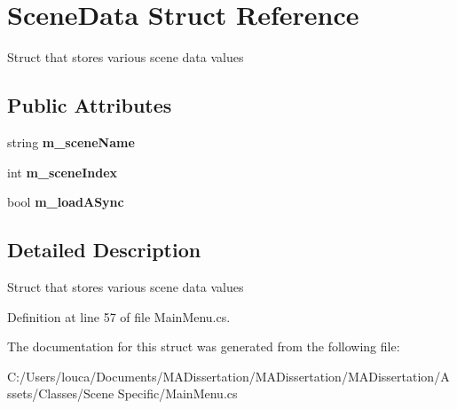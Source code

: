 \hypertarget{struct_scene_data}{}\section{Scene\+Data Struct Reference}
\label{struct_scene_data}


Struct that stores various scene data values  


\subsection*{Public Attributes}
\begin{DoxyCompactItemize}
\item 
\mbox{\label{struct_scene_data_a21525ac0e4967dd28c90f423bdf8082f}} 
string {\bfseries m\+\_\+scene\+Name}
\item 
\mbox{\label{struct_scene_data_a090335ef7fb48d46b1fec4a37b2f112d}} 
int {\bfseries m\+\_\+scene\+Index}
\item 
\mbox{\label{struct_scene_data_a06a2ef794bb7dccc71f5748983685969}} 
bool {\bfseries m\+\_\+load\+A\+Sync}
\end{DoxyCompactItemize}


\subsection{Detailed Description}
Struct that stores various scene data values 



Definition at line 57 of file Main\+Menu.\+cs.



The documentation for this struct was generated from the following file\+:\begin{DoxyCompactItemize}
\item 
C\+:/\+Users/louca/\+Documents/\+M\+A\+Dissertation/\+M\+A\+Dissertation/\+M\+A\+Dissertation/\+Assets/\+Classes/\+Scene Specific/Main\+Menu.\+cs\end{DoxyCompactItemize}
